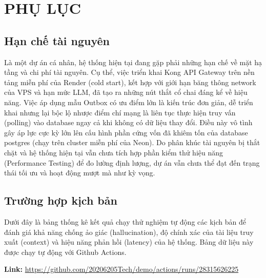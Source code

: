 \newpage
{}
{\centering \section*{PHỤ LỤC}}

\setcounter{figure}{0}
\renewcommand{\thefigure}{PL.\arabic{figure}}
\setcounter{table}{0}
\renewcommand{\thetable}{PL.\arabic{table}}

\subsection*{Hạn chế tài nguyên}

Là một dự án cá nhân,
hệ thống hiện tại đang gặp phải những
hạn chế
về mặt hạ tầng và chi phí tài nguyên.
Cụ thể, việc triển khai Kong API Gateway
trên nền tảng miễn phí của Render (cold start),
kết hợp với giới hạn
băng thông network của VPS
và hạn mức LLM, đã tạo ra những nút thắt cổ chai đáng kể về hiệu năng.
Việc áp dụng mẫu Outbox có ưu điểm lớn là kiến trúc đơn giản,
dễ triển khai
nhưng lại bộc lộ nhược điểm chí mạng là liên tục thực hiện truy vấn (polling) vào database ngay cả khi không có dữ liệu thay đổi.
Điều này vô tình gây áp lực cực kỳ lớn lên cấu hình phần cứng vốn đã khiêm tốn của database postgres (chạy trên cluster miễn phí của Neon).
Do phân khúc tài nguyên bị thắt chặt và hệ thống hiện tại vẫn chưa tích hợp phần kiểm thử hiệu năng (Performance Testing) để đo lường định lượng, dự án vẫn chưa thể đạt đến trạng thái tối ưu và hoạt động mượt mà như kỳ vọng.


\subsection*{Trường hợp kịch bản}

Dưới đây là bảng thống kê kết quả chạy thử nghiệm tự động các kịch bản
để đánh giá khả năng chống ảo giác (hallucination), độ chính xác của tài liệu truy xuất (context) và hiệu năng phản hồi (latency) của hệ thống.
Bảng dữ liệu
này
được chạy tự động
với Github Actions.

\textbf{Link:} \url{https://github.com/20206205Tech/demo/actions/runs/28315626225}

